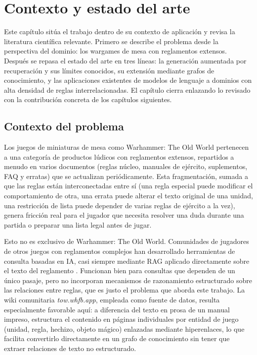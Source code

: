 \documentclass[11pt,a4paper,spanish]{book}
\numberwithin{equation}{chapter}
\numberwithin{figure}{chapter}
\numberwithin{table}{chapter}
\begin{document}
\chapter{Contexto y estado del arte}

Este capítulo sitúa el trabajo dentro de su contexto de aplicación y revisa la literatura científica relevante. Primero se describe el problema desde la perspectiva del dominio: los wargames de mesa con reglamentos extensos. Después se repasa el estado del arte en tres líneas: la generación aumentada por recuperación y sus límites conocidos, su extensión mediante grafos de conocimiento, y las aplicaciones existentes de modelos de lenguaje a dominios con alta densidad de reglas interrelacionadas. El capítulo cierra enlazando lo revisado con la contribución concreta de los capítulos siguientes.

\section{Contexto del problema}

Los juegos de miniaturas de mesa como Warhammer: The Old World pertenecen a una categoría de productos lúdicos con reglamentos extensos, repartidos a menudo en varios documentos (reglas núcleo, manuales de ejército, suplementos, FAQ y erratas) que se actualizan periódicamente. Esta fragmentación, sumada a que las reglas están interconectadas entre sí (una regla especial puede modificar el comportamiento de otra, una errata puede alterar el texto original de una unidad, una restricción de lista puede depender de varias reglas de ejército a la vez), genera fricción real para el jugador que necesita resolver una duda durante una partida o preparar una lista legal antes de jugar.

Esto no es exclusivo de Warhammer: The Old World. Comunidades de jugadores de otros juegos con reglamentos complejos han desarrollado herramientas de consulta basadas en IA, casi siempre mediante RAG aplicado directamente sobre el texto del reglamento \cite{boardgameguru2023}. Funcionan bien para consultas que dependen de un único pasaje, pero no incorporan mecanismos de razonamiento estructurado sobre las relaciones entre reglas, que es justo el problema que aborda este trabajo. La wiki comunitaria \emph{tow.whfb.app}, empleada como fuente de datos, resulta especialmente favorable aquí: a diferencia del texto en prosa de un manual impreso, estructura el contenido en páginas individuales por entidad de juego (unidad, regla, hechizo, objeto mágico) enlazadas mediante hiperenlaces, lo que facilita convertirlo directamente en un grafo de conocimiento sin tener que extraer relaciones de texto no estructurado.
\end{document}
